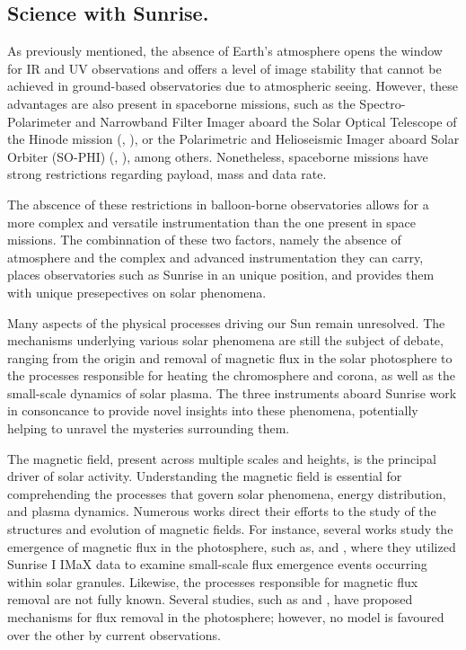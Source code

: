 \subsection{Science with Sunrise.}

As previously mentioned, the absence of Earth's atmosphere opens the window for IR and UV observations and offers a level of image stability that cannot be achieved in ground-based observatories due to atmospheric seeing. However, these advantages are also present in spaceborne missions, such as the Spectro-Polarimeter and Narrowband Filter Imager aboard the Solar Optical Telescope of the Hinode mission (\citealt{Hinode}, \citealt{sot}), or the Polarimetric and Helioseismic Imager aboard Solar Orbiter (SO-PHI) (\citealt{PHI}, \citealt{SO}), among others. Nonetheless, spaceborne missions have strong restrictions regarding payload, mass and data rate. 

The abscence of these restrictions in balloon-borne observatories allows for a more complex and versatile instrumentation than the one present in space missions. The combinnation of these two factors, namely the absence of atmosphere and the complex and advanced instrumentation they can carry, places observatories such as Sunrise in an unique position, and provides them with unique presepectives on solar phenomena.

Many aspects of the physical processes driving our Sun remain unresolved. The mechanisms underlying various solar phenomena are still the subject of debate, ranging from the origin and removal of magnetic flux in the solar photosphere to the processes responsible for heating the chromosphere and corona, as well as the small-scale dynamics of solar plasma. The three instruments aboard Sunrise work in consoncance to provide novel insights into these phenomena, potentially helping to unravel the mysteries surrounding them.

The magnetic field, present across multiple scales and heights, is the principal driver of solar activity. Understanding the magnetic field is essential for comprehending the processes that govern solar phenomena, energy distribution, and plasma dynamics. Numerous works direct their efforts to the study of the structures and evolution of magnetic fields. For instance, several works study  the emergence of magnetic flux in the photosphere, such as, \cite{flux_emergence_1} and \cite{flux_emergence_2}, where they utilized Sunrise I IMaX data to examine small-scale flux emergence events occurring within solar granules. Likewise, the processes responsible for magnetic flux removal are not fully known. Several studies, such as \cite{flux_removal_1} and \cite{flux_emergence_2}, have proposed mechanisms for flux removal in the photosphere; however, no model is favoured over the other by current observations.

